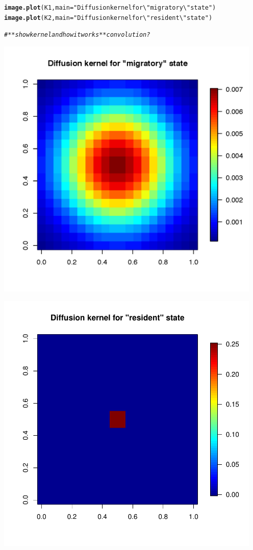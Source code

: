 \documentclass{article}\usepackage[]{graphicx}\usepackage[]{color}
\makeatletter
\newcommand{\hlstr}[1]{\textcolor[rgb]{0.192,0.494,0.8}{#1}}%
\newcommand{\hlcom}[1]{\textcolor[rgb]{0.678,0.584,0.686}{\textit{#1}}}%
\newcommand{\hlstd}[1]{\textcolor[rgb]{0.345,0.345,0.345}{#1}}%
\newcommand{\hlkwc}[1]{\textcolor[rgb]{0.333,0.667,0.333}{#1}}%
\newcommand{\hlkwd}[1]{\textcolor[rgb]{0.737,0.353,0.396}{\textbf{#1}}}%
\newenvironment{kframe}{%
 \def\at@end@of@kframe{}%
 \ifinner\ifhmode%
  \def\at@end@of@kframe{\end{minipage}}%
  \begin{minipage}{\columnwidth}%
 \fi\fi%
 \def\FrameCommand##1{\hskip\@totalleftmargin \hskip-\fboxsep
 \colorbox{shadecolor}{##1}\hskip-\fboxsep
     \hskip-\linewidth \hskip-\@totalleftmargin \hskip\columnwidth}%
 \MakeFramed {\advance\hsize-\width
   \@totalleftmargin\z@ \linewidth\hsize
   \@setminipage}}%
 {\par\unskip\endMakeFramed%
 \at@end@of@kframe}
\newenvironment{knitrout}{}{} %
\makeatother
\begin{document}
\begin{knitrout}
\begin{kframe}
\begin{alltt}
\hlkwd{image.plot}\hlstd{(K1,} \hlkwc{main} \hlstd{=} \hlstr{"Diffusion kernel for \textbackslash{}"migratory\textbackslash{}" state"}\hlstd{)}
\hlkwd{image.plot}\hlstd{(K2,} \hlkwc{main} \hlstd{=} \hlstr{"Diffusion kernel for \textbackslash{}"resident\textbackslash{}" state"}\hlstd{)}

\hlcom{# ** show kernel and how it works ** convolution?}
\end{alltt}
\end{kframe}
\end{knitrout}
 
\includegraphics[width=5in, keepaspectratio]{./pars1.png}

\includegraphics[width=5in, keepaspectratio]{./pars2.pdf}
\end{document}
